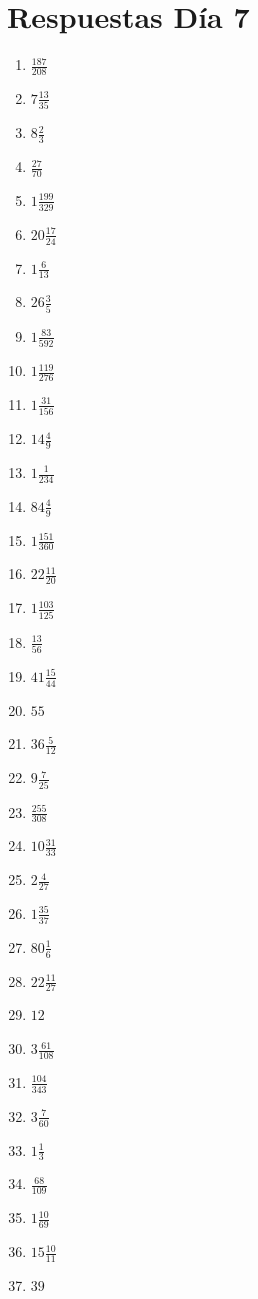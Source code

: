 \documentclass[12pt]{article}
\begin{document}
\section*{Respuestas Día 7}
\begin{enumerate}
\item $ \frac{187}{208} $
\item $ 7 \frac{13}{35} $
\item $ 8 \frac{2}{3} $
\item $ \frac{27}{70} $
\item $ 1 \frac{199}{329} $
\item $ 20 \frac{17}{24} $
\item $ 1 \frac{6}{13} $
\item $ 26 \frac{3}{5} $
\item $ 1 \frac{83}{592} $
\item $ 1 \frac{119}{276} $
\item $ 1 \frac{31}{156} $
\item $ 14 \frac{4}{9} $
\item $ 1 \frac{1}{234} $
\item $ 84 \frac{4}{9} $
\item $ 1 \frac{151}{360} $
\item $ 22 \frac{11}{20} $
\item $ 1 \frac{103}{125} $
\item $ \frac{13}{56} $
\item $ 41 \frac{15}{44} $
\item $ 55 $
\item $ 36 \frac{5}{12} $
\item $ 9 \frac{7}{25} $
\item $ \frac{255}{308} $
\item $ 10 \frac{31}{33} $
\item $ 2 \frac{4}{27} $
\item $ 1 \frac{35}{37} $
\item $ 80 \frac{1}{6} $
\item $ 22 \frac{11}{27} $
\item $ 12 $
\item $ 3 \frac{61}{108} $
\item $ \frac{104}{343} $
\item $ 3 \frac{7}{60} $
\item $ 1 \frac{1}{3} $
\item $ \frac{68}{109} $
\item $ 1 \frac{10}{69} $
\item $ 15 \frac{10}{11} $
\item $ 39 $

\end{enumerate}
\end{document}
